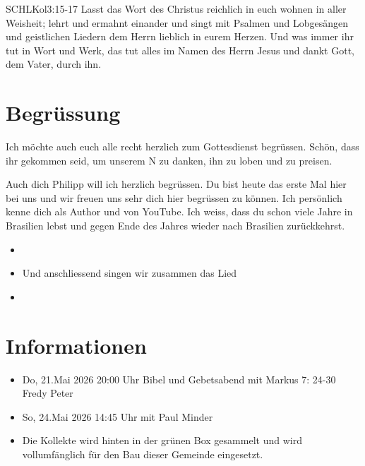 \documentclass[fontsize=14pt]{../../inc/mybib}
\newcommand{\Name}{Philipp}
\begin{document}
\begin{bibelbox}{SCHL}{Kol}{3:15-17}
    Lasst das Wort des Christus reichlich in euch wohnen in aller Weisheit; lehrt und ermahnt einander und singt mit Psalmen und Lobgesängen und geistlichen Liedern dem Herrn lieblich in eurem Herzen. Und was immer ihr tut in Wort und Werk, das tut alles im Namen des Herrn Jesus und dankt Gott, dem Vater, durch ihn.
\end{bibelbox}
\section{Begrüssung}
Ich möchte auch euch alle recht herzlich zum Gottesdienst begrüssen. Schön, dass ihr gekommen seid, um unserem \herr N zu danken, ihn zu loben und zu preisen.

Auch dich \Name{} will ich herzlich begrüssen. Du bist heute das erste Mal hier bei uns und wir freuen uns sehr dich hier begrüssen zu können. Ich persönlich kenne dich als Author und von YouTube. Ich weiss, dass du schon viele Jahre in Brasilien lebst und gegen Ende des Jahres wieder nach Brasilien zurückkehrst.
\begin{itemize}
    \item[] 
    \item[] Und anschliessend singen wir zusammen das Lied
    \item[] 
\end{itemize}

\section{Informationen}
\begin{itemize}
    \item {} Do, 21.Mai 2026 20:00 Uhr Bibel und Gebetsabend mit Markus 7: 24-30 Fredy Peter
    \item {} So, 24.Mai 2026 14:45 Uhr mit Paul Minder
    \item {} Die Kollekte wird hinten in der grünen Box gesammelt und wird vollumfänglich für den Bau dieser Gemeinde eingesetzt.
\end{itemize}
\end{document}
